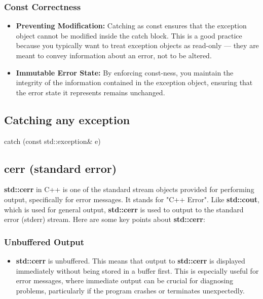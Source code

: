 \documentclass{report}
\begin{document}
    \bigbreak \noindent 
    \subsubsection{Const Correctness}
    \bigbreak \noindent 
    \begin{itemize}
        \item \textbf{Preventing Modification:} Catching as const ensures that the exception object cannot be modified inside the catch block. This is a good practice because you typically want to treat exception objects as read-only — they are meant to convey information about an error, not to be altered.
        \item \textbf{Immutable Error State:} By enforcing const-ness, you maintain the integrity of the information contained in the exception object, ensuring that the error state it represents remains unchanged.
    \end{itemize}

    \bigbreak \noindent 
    \subsection{Catching any exception}
    \bigbreak \noindent 
    \begin{cppcode}
        catch (const std::exception& e)
    \end{cppcode}

    \bigbreak \noindent 
    \subsection{cerr (standard error)}
    \bigbreak \noindent 
    \textbf{std::cerr} in C++ is one of the standard stream objects provided for performing output, specifically for error messages. It stands for "C++ Error". Like \textbf{std::cout}, which is used for general output, \textbf{std::cerr} is used to output to the standard error (stderr) stream. Here are some key points about \textbf{std::cerr}:
    \bigbreak \noindent 
    \subsubsection{Unbuffered Output}
    \begin{itemize}
        \item \textbf{std::cerr} is unbuffered. This means that output to \textbf{std::cerr} is displayed immediately without being stored in a buffer first. This is especially useful for error messages, where immediate output can be crucial for diagnosing problems, particularly if the program crashes or terminates unexpectedly.
    \end{itemize}
\end{document}
